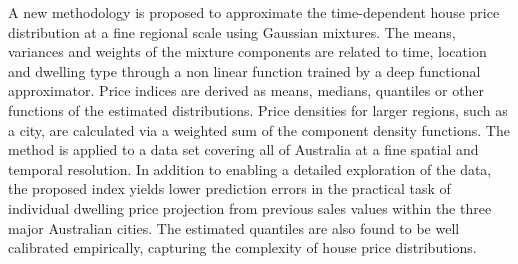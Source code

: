 A new methodology is proposed to approximate the time-dependent house price distribution at a fine regional scale using Gaussian mixtures. The means, variances and weights of the mixture components are related to time, location and dwelling type through a non linear function trained by a deep functional approximator. Price indices are derived as means, medians, quantiles or other functions of the estimated distributions. Price densities for larger regions, such as a city, are calculated via a weighted sum of the component density functions. The method is applied to a data set covering all of Australia at a fine spatial and temporal resolution. In addition to enabling a detailed exploration of the data, the proposed index yields lower prediction errors in the practical task of individual dwelling price projection from previous sales values within the three major Australian cities.  The estimated quantiles are also found to be well calibrated empirically, capturing the complexity of house price distributions.